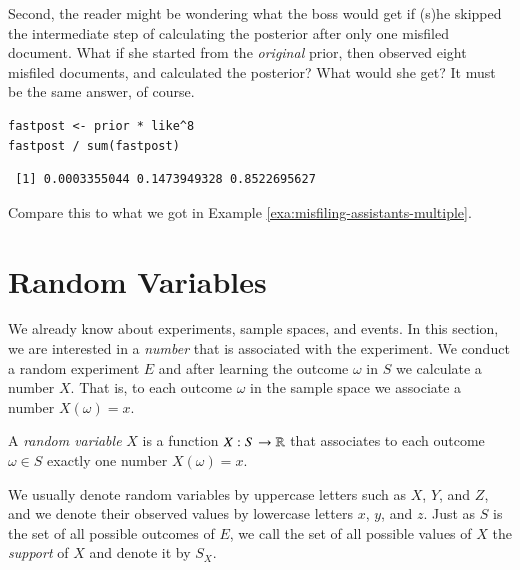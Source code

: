 \documentclass[captions=tableheading]{scrbook}
\begin{document}
Second, the reader might be wondering what the boss would get if (s)he skipped the intermediate step of calculating the posterior after only one misfiled document. What if she started from the \emph{original} prior, then observed eight misfiled documents, and calculated the posterior? What would she get? It must be the same answer, of course.


\begin{verbatim}
fastpost <- prior * like^8
fastpost / sum(fastpost)
\end{verbatim}

\begin{verbatim}
 [1] 0.0003355044 0.1473949328 0.8522695627
\end{verbatim}

Compare this to what we got in Example \ref{exa:misfiling-assistants-multiple}.
\section{Random Variables}
\label{sec-4-9}

\label{sec:Random-Variables}

We already know about experiments, sample spaces, and events. In this section, we are interested in a \emph{number} that is associated with the experiment. We conduct a random experiment \(E\) and after learning the outcome \(\omega\) in \(S\) we calculate a number \(X\). That is, to each outcome \(\omega\) in the sample space we associate a number \(X(\omega)=x\). 

\begin{defn}
A \emph{random variable} \(X\) is a function \(X:S\to\mathbb{R}\) that associates to each outcome \(\omega\in S\) exactly one number \(X(\omega)=x\). 
\end{defn}

We usually denote random variables by uppercase letters such as \(X\), \(Y\), and \(Z\), and we denote their observed values by lowercase letters \(x\), \(y\), and \(z\). Just as \(S\) is the set of all possible outcomes of \(E\), we call the set of all possible values of \(X\) the \emph{support} of \(X\) and denote it by \(S_{X}\).
\end{document}

